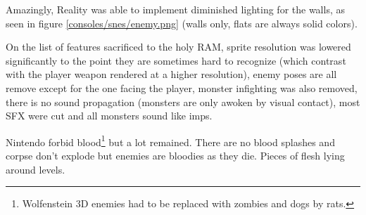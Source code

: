 \par
Amazingly, Reality was able to implement diminished lighting for the walls, as seen in figure \ref{consoles/snes/enemy.png} (walls only, flats are always solid colors).\\
\par
 On the list of features sacrificed to the holy RAM, sprite resolution was lowered significantly to the point they are sometimes hard to recognize (which contrast with the player weapon rendered at a higher resolution), enemy poses are all remove except for the one facing the player, monster infighting was also removed, there is no sound propagation (monsters are only awoken by visual contact), most SFX were cut and all monsters sound like imps.
\\
\par
Nintendo forbid blood\footnote{Wolfenstein 3D enemies had to be replaced with zombies and dogs by rats.} but a lot remained. There are no blood splashes and corpse don't explode but enemies are bloodies as they die. Pieces of flesh lying around levels.	


   
